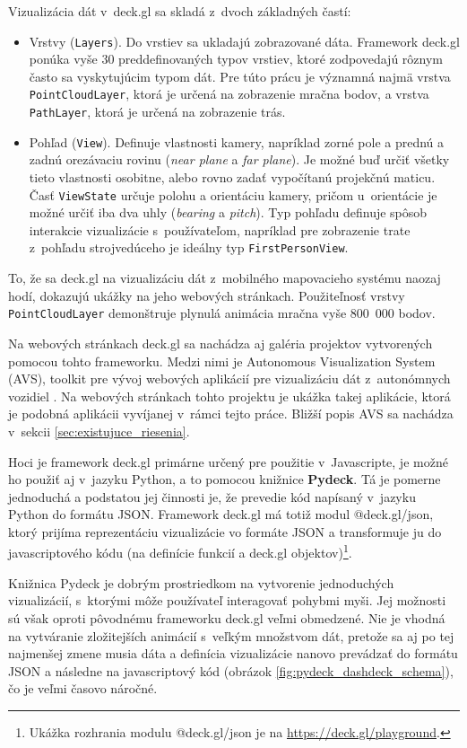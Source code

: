 Vizualizácia dát v~deck.gl sa skladá z~dvoch základných častí:
\begin{itemize}
    \item Vrstvy (\texttt{Layers}). Do vrstiev sa ukladajú zobrazované dáta. Framework deck.gl ponúka vyše 30 preddefinovaných typov vrstiev, ktoré zodpovedajú rôznym často sa vyskytujúcim typom dát. Pre túto prácu je významná najmä vrstva \texttt{PointCloudLayer}, ktorá je určená na zobrazenie mračna bodov, a vrstva \texttt{PathLayer}, ktorá je určená na zobrazenie trás.
    \item Pohľad (\texttt{View}). Definuje vlastnosti kamery, napríklad zorné pole a prednú a zadnú orezávaciu rovinu (\emph{near plane} a \emph{far plane}). Je možné buď určiť všetky tieto vlastnosti osobitne, alebo rovno zadať vypočítanú projekčnú maticu.
    Časť \texttt{ViewState} určuje polohu a orientáciu kamery, pričom u~orientácie je možné určiť iba dva uhly (\emph{bearing} a \emph{pitch}). Typ pohľadu definuje spôsob interakcie vizualizácie s~používateľom, napríklad pre zobrazenie trate z~pohľadu strojvedúceho je ideálny typ \texttt{FirstPersonView}.
\end{itemize}

To, že sa deck.gl na vizualizáciu dát z~mobilného mapovacieho systému naozaj hodí, dokazujú ukážky na jeho webových stránkach. Použiteľnosť vrstvy \texttt{PointCloudLayer} demonštruje plynulá animácia mračna vyše 800~000 bodov.

Na webových stránkach deck.gl sa nachádza aj galéria projektov vytvorených pomocou tohto frameworku. Medzi nimi je Autonomous Visualization System (AVS), toolkit pre vývoj webových aplikácií pre vizualizáciu dát z~autonómnych vozidiel \cite{avs}. Na webových stránkach tohto projektu je ukážka takej aplikácie, ktorá je podobná aplikácii vyvíjanej v~rámci tejto práce. Bližší popis AVS sa nachádza v~sekcii \ref{sec:existujuce_riesenia}.

Hoci je framework deck.gl primárne určený pre použitie v~Javascripte, je možné ho použiť aj v~jazyku Python, a to pomocou knižnice \textbf{Pydeck}. Tá je pomerne jednoduchá a podstatou jej činnosti je, že prevedie kód napísaný v~jazyku Python do formátu JSON. Framework deck.gl má totiž modul @deck.gl/json, ktorý prijíma reprezentáciu vizualizácie vo formáte JSON a transformuje ju do javascriptového kódu (na definície funkcií a deck.gl objektov)\footnote{Ukážka rozhrania modulu @deck.gl/json je na \url{https://deck.gl/playground}.}.

Knižnica Pydeck je dobrým prostriedkom na vytvorenie jednoduchých vizualizácií, s~ktorými môže používateľ interagovať pohybmi myši. Jej možnosti sú však oproti pôvodnému frameworku deck.gl veľmi obmedzené. Nie je vhodná na vytváranie zložitejších animácií s~veľkým množstvom dát, pretože sa aj po tej najmenšej zmene musia dáta a definícia vizualizácie nanovo prevádzať do formátu JSON a následne na javascriptový kód (obrázok \ref{fig:pydeck_dashdeck_schema}), čo je veľmi časovo náročné.

